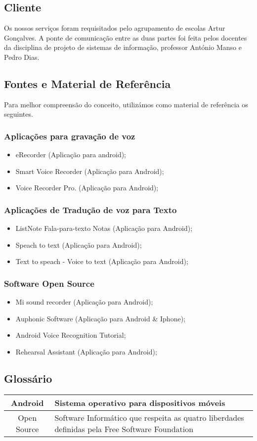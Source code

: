 \documentclass[a4paper,titlepage]{article}
\begin{document}
		\newpage
		\subsection{Cliente}
				Os nossos serviços foram requisitados pelo agrupamento de escolas Artur Gonçalves. A ponte de comunicação entre as duas partes foi feita pelos docentes da disciplina de projeto de sistemas de informação, professor António Manso e Pedro Dias. 
				
				\subsection{Fontes e Material de Referência}
				Para melhor compreensão do conceito, utilizámos como material de referência os seguintes.
				\subsubsection{Aplicações para gravação de voz} 
					\begin{itemize}
						\item eRecorder (Aplicação para android);
						\item Smart Voice Recorder (Aplicação para Android);
						\item Voice Recorder Pro. (Aplicação para Android);		
					\end{itemize} 
				\subsubsection{Aplicações de Tradução de voz para Texto}
					\begin{itemize}
						\item ListNote Fala-para-texto Notas (Aplicação para Android); 
						\item Speach to text (Aplicação para Android);
						\item Text to speach - Voice to text (Aplicação para Android);
					\end{itemize}
				\subsubsection{Software Open Source}
					\begin{itemize}
						\item Mi sound recorder (Aplicação para Android);
						\item Auphonic Software (Aplicação para Android \& Iphone);
						\item Android Voice Recognition Tutorial;
						\item Rehearsal Assistant (Aplicação para Android);
					\end{itemize}
				
				\subsection{Glossário}
				\begin{tabular}{|c|p{8cm}|}
				\hline Android & Sistema operativo para dispositivos móveis \\ 
				\hline Open Source  & Software Informático que respeita as quatro liberdades definidas pela Free Software Foundation \\ 
				\hline 
				\end{tabular} 
		
		
\end{document}
